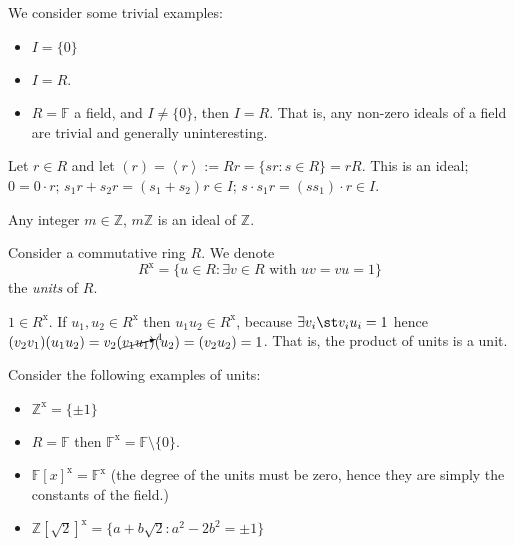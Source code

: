 \documentclass[12pt,oneside]{article}
\begin{document}
\begin{example}
  We consider some trivial examples:
  \begin{itemize}
    \item $I = \{0\}$
    \item $I = R$. 
    \item $R = \mathbb{F}$ a field, and $I \neq \{0\}$, then $I = R$. That is, any non-zero ideals of a field are trivial and generally uninteresting.
  \end{itemize}
\end{example}

\begin{definition}
  Let $r \in R$ and let $(r) = \left\langle r\right\rangle := Rr = \{sr : s \in R\} = r R$. This is an ideal; $0 = 0 \cdot r$; $s_1 r + s_2 r = (s_1 + s_2)r \in I$; $s\cdot s_1 r = (s s_1)\cdot r \in I$.
\end{definition}

\begin{example}
  Any integer $m \in \mathbb{Z}$, $m \mathbb{Z}$ is an ideal of $\mathbb{Z}$.
\end{example}

\begin{definition}[Units of R]
  Consider a commutative ring $R$. We denote \[
  R^{\text{x}} = \{u \in R : \exists v \in R \text{ with } uv = vu = 1\}  
  \]
  the \emph{units} of $R$.
\end{definition}

\begin{remark}
  $1 \in R^{\text{x}}$. If $u_1, u_2 \in R^{\text{x}}$ then $u_1u_2 \in R^{\text{x}}$, because $\exists v_i \st v_i u_i = 1$ hence $(v_2 v_1) (u_1 u_2) = v_2(\cancelto{1}{v_1u_1})(u_2) = (v_2u_2)=1$. That is, the product of units is a unit.
\end{remark}
\begin{example}
  Consider the following examples of units:
  \begin{itemize}
    \item $\mathbb{Z}^{\text{x}} = \{\pm 1\}$
    \item $R = \mathbb{F}$ then $\mathbb{F}^{\text{x}} = \mathbb{F}\setminus \{0\}$.
    \item $\mathbb{F}[x]^\text{x} = \mathbb{F}^{\text{x}}$ (the degree of the units must be zero, hence they are simply the constants of the field.)
    \item $\mathbb{Z}[\sqrt{2}]^{\text{x}} = \{a + b\sqrt{2} : a^2 - 2b^2 = \pm 1\}$\footnotemark
  \end{itemize}
\end{example}
\end{document}
